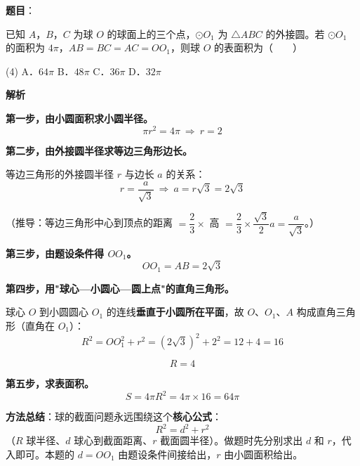 \begin{answer}

\textbf{题目}：

已知 $A$，$B$，$C$ 为球 $O$ 的球面上的三个点，$\odot O_1$ 为 $\triangle ABC$ 的外接圆。若 $\odot O_1$ 的面积为 $4\pi$，$AB=BC=AC=OO_1$，则球 $O$ 的表面积为\mbox{（　　）}

\begin{gkopts}(4)
\task A．$64\pi$
\task B．$48\pi$
\task C．$36\pi$
\task D．$32\pi$
\end{gkopts}

\textbf{解析}

\textbf{第一步，由小圆面积求小圆半径。}
\nopagebreak[4]
\[\pi r^{2}=4\pi\ \Longrightarrow\ r=2\]

\textbf{第二步，由外接圆半径求等边三角形边长。}

等边三角形的外接圆半径 $r$ 与边长 $a$ 的关系：
\nopagebreak[4]
\[r=\frac a{\sqrt3}\ \Longrightarrow\ a=r\sqrt3=2\sqrt3\]

（推导：等边三角形中心到顶点的距离 $=\dfrac23\times$ 高 $=\dfrac23\times\dfrac{\sqrt3}2a=\dfrac a{\sqrt3}$。）

\textbf{第三步，由题设条件得 $OO_1$。}
\nopagebreak[4]
\[OO_1=AB=2\sqrt3\]

\textbf{第四步，用"球心—小圆心—圆上点"的直角三角形。}

球心 $O$ 到小圆圆心 $O_1$ 的连线\textbf{垂直于小圆所在平面}，故 $O$、$O_1$、$A$ 构成直角三角形（直角在 $O_1$）：
\nopagebreak[4]
\[R^{2}=OO_1^{2}+r^{2}=\left(2\sqrt3\right)^{2}+2^{2}=12+4=16\]

\nopagebreak[4]
\[R=4\]

\textbf{第五步，求表面积。}
\nopagebreak[4]
\[S=4\pi R^{2}=4\pi\times16=64\pi\]

\begin{gktip}
\textbf{方法总结}：球的截面问题永远围绕这个\textbf{核心公式}：
\nopagebreak[4]
\[R^{2}=d^{2}+r^{2}\]
（$R$ 球半径、$d$ 球心到截面距离、$r$ 截面圆半径）。做题时先分别求出 $d$ 和 $r$，代入即可。本题的 $d=OO_1$ 由题设条件间接给出，$r$ 由小圆面积给出。
\end{gktip}


\par\medskip

\end{answer}
